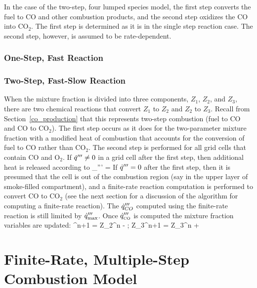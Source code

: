 In the case of the two-step, four lumped species model, the first step converts the
fuel to CO and other combustion products, and the second step oxidizes the CO into CO$_2$.  The first step is
determined as it is in the single step reaction case.  The second step, however, is assumed to be rate-dependent.


\subsubsection{One-Step, Fast Reaction}





\subsubsection{Two-Step, Fast-Slow Reaction}

When the mixture fraction is divided into three components, $Z_1$, $Z_2$, and $Z_3$, there are two chemical
reactions that convert $Z_1$ to $Z_2$ and $Z_2$ to $Z_3$.  Recall from Section~\ref{co_production}
that this represents two-step combustion (fuel to CO and CO to CO$_2$).
The first step occurs as it does for the two-parameter mixture fraction with a modified heat of combustion that
accounts for the conversion of fuel to CO rather than CO$_2$.
The second step is performed for all grid cells that contain CO and O$_2$.   If $\dot{q}''' \neq 0$ in a grid
cell after the first step, then additional heat is released according to
\be \dq_{\CO}''' = \min {}     \ee
If $\dot{q}'''=0$ after the first step, then it is presumed that the cell is out of the combustion region (say in the upper layer of
smoke-filled compartment), and a finite-rate reaction computation is performed to convert CO to CO$_2$ (see the next section for
a discussion of the algorithm for computing a finite-rate reaction).  The $\dot{q}'''_{CO}$ computed using the finite-rate
reaction is still limited by $\dot{q}_{\max}'''$.  Once $\dot{q}'''_{{\tiny \hbox{CO}}}$ is computed the mixture fraction variables are updated:
^{n+1} = {Z_2}^n -  \quad ; \quad
{Z_3}^{n+1} = {Z_3}^n +  \ee



\newpage
\section{Finite-Rate, Multiple-Step Combustion Model}

